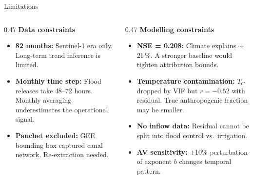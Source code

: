 \documentclass[10pt]{beamer}
\begin{document}
\begin{frame}{Limitations}
  \begin{columns}[T]
    \begin{column}{0.47\textwidth}
      \small\textbf{Data constraints}
      \begin{itemize}\footnotesize
        \item \textbf{82 months:} Sentinel-1 era only.
              Long-term trend inference is limited.
        \item \textbf{Monthly time step:} Flood releases
              take 48--72 hours. Monthly averaging
              underestimates the operational signal.
        \item \textbf{Panchet excluded:} GEE bounding box
              captured canal network. Re-extraction needed.
      \end{itemize}
    \end{column}
    \begin{column}{0.47\textwidth}
      \small\textbf{Modelling constraints}
      \begin{itemize}\footnotesize
        \item \textbf{NSE = 0.208:} Climate explains
              $\sim$21\,\%. A stronger baseline would
              tighten attribution bounds.
        \item \textbf{Temperature contamination:}
              $T_C$ dropped by VIF but $r = -0.52$
              with residual. True anthropogenic fraction
              may be smaller.
        \item \textbf{No inflow data:} Residual cannot
              be split into flood control vs.\ irrigation.
        \item \textbf{AV sensitivity:} $\pm$10\%
              perturbation of exponent $b$ changes
              temporal pattern.
      \end{itemize}
    \end{column}
  \end{columns}
\end{frame}
\end{document}
